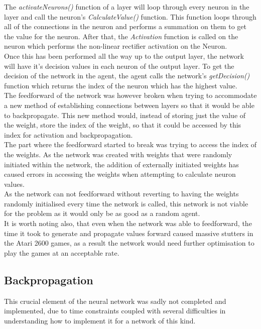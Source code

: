 \documentclass[10pt]{article}
\begin{document}
	 The \textit{activateNeurons()} function of a layer will loop through every neuron in the layer and call the neuron's \textit{CalculateValue()} function. This function loops through all of the connections in the neuron and performs a summation on them to get the value for the neuron. After that, the \textit{Activation} function is called on the neuron which performs the non-linear rectifier activation on the Neuron.\\
	
	Once this has been performed all the way up to the output layer, the network will have it's decision values in each neuron of the output layer. To get the decision of the network in the agent, the agent calls the network's \textit{getDecision()} function which returns the index of the neuron which has the highest value.\\
	
	The feedforward of the network was however broken when trying to accommodate a new method of establishing connections between layers so that it would be able to backpropagate. This new method would, instead of storing just the value of the weight, store the index of the weight, so that it could be accessed by this index for activation and backpropagation.\\
	
	The part where the feedforward started to break was trying to access the index of the weights. As the network was created with weights that were randomly initiated within the network, the addition of externally initiated weights has caused errors in accessing the weights when attempting to calculate neuron values.\\
	
	As the network can not feedforward without reverting to having the weights randomly initialised every time the network is called, this network is not viable for the problem as it would only be as good as a random agent.\\
	
	It is worth noting also, that even when the network was able to feedforward, the time it took to generate and propagate values forward caused massive stutters in the Atari 2600 games, as a result the network would need further optimisation to play the games at an acceptable rate.
	\medskip
	
	\subsection{Backpropagation}
		This crucial element of the neural network was sadly not completed and implemented, due to time constraints coupled with several difficulties in understanding how to implement it for a network of this kind.\\		
		
\end{document}
